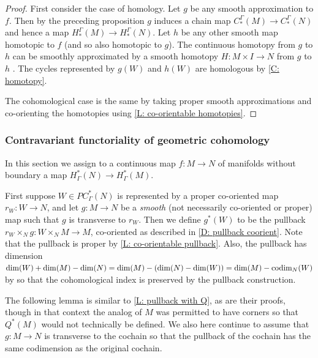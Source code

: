 \begin{proof}
	First consider the case of homology. Let $g$ be any smooth approximation to $f$. Then by the preceding proposition $g$ induces a chain map $C_*^\Gamma(M) \to C_*^\Gamma(N)$ and hence a map $H_*^\Gamma(M) \to H_*^\Gamma(N)$. Let $h$ be any other smooth map homotopic to $f$ (and so also homotopic to $g$). The continuous homotopy from $g$ to $h$ can be smoothly approximated by a smooth homotopy $H \colon M \times I \to N$ from $g$ to $h$ \cite[Theorem III.2.5]{Kos93}. The cycles represented by $g(W)$ and $h(W)$ are homologous by \cref{C: homotopy}.

	The cohomological case is the same by taking proper smooth approximations and co-orienting the homotopies using \cref{L: co-orientable homotopies}.
\end{proof}

\subsubsection{Contravariant functoriality of geometric cohomology}\label{S: cohomology pullback}

In this section we assign to a continuous map $f \colon M \to N$ of manifolds without boundary a map $H^*_\Gamma(N) \to H^*_\Gamma(M)$.

First suppose $W \in PC^*_\Gamma(N)$ is represented by a proper co-oriented map $r_W \colon W \to N$, and let
$g \colon M \to N$ be a \textit{smooth} (not necessarily co-oriented or proper) map such that $g$ is transverse to $r_W$. Then we define $g^*(W)$ to be the pullback $r_W \times_N g \colon W \times_N M \to M$, co-oriented as described in \cref{D: pullback coorient}. Note that the pullback is proper by \cref{L: co-orientable pullback}. Also, the pullback has dimension $\dim(W)+\dim(M)-\dim(N) = \dim(M)-(\dim(N)-\dim(W)) = \dim(M)-\text{codim}_N(W)$ by \cite[Theorem 6.4]{Joy12} so that the cohomological index is preserved by the pullback construction.

The following lemma is similar to \cref{L: pullback with Q}, as are their proofs, though in that context the analog of $M$ was permitted to have corners so that $Q^*(M)$ would not technically be defined. We also here continue to assume that $g \colon M \to N$ is transverse to the cochain so that the pullback of the cochain has the same codimension as the original cochain. 

